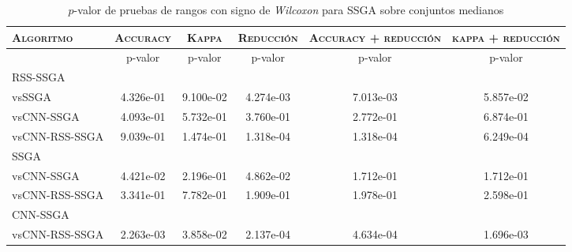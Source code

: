 \begin{table}[h!]
\centering
\begin{adjustbox}{max width =\textwidth}
\begin{tabular}{l c c c c c}
\hline
	\textsc{Algoritmo}
	& \multicolumn{1}{c}{\textsc{Accuracy}}
	& \multicolumn{1}{c}{\textsc{Kappa}}
	& \multicolumn{1}{c}{\textsc{Reducción}} 
	& \multicolumn{1}{c}{\textsc{Accuracy + reducción}} 
	& \multicolumn{1}{c}{\textsc{kappa + reducción}} \\
\hline
\hline

 & p-valor & p-valor & p-valor & p-valor & p-valor \\

RSS-SSGA\\
vsSSGA & 4.326e-01 & 9.100e-02 & 4.274e-03 & 7.013e-03 & 5.857e-02 \\
vsCNN-SSGA & 4.093e-01 & 5.732e-01 & 3.760e-01 & 2.772e-01 & 6.874e-01 \\ 
vsCNN-RSS-SSGA & 9.039e-01 & 1.474e-01 & 1.318e-04 & 1.318e-04 & 6.249e-04 \\

\hline

SSGA\\
vsCNN-SSGA & 4.421e-02 & 2.196e-01 & 4.862e-02 & 1.712e-01 & 1.712e-01 \\  
vsCNN-RSS-SSGA & 3.341e-01 & 7.782e-01 & 1.909e-01 & 1.978e-01 & 2.598e-01 \\ 

\hline

CNN-SSGA\\
vsCNN-RSS-SSGA & 2.263e-03 & 3.858e-02 & 2.137e-04 & 4.634e-04 & 1.696e-03 \\


\hline

\end{tabular}
\end{adjustbox}
\caption[Pruebas de \emph{Wilcoxon} entre SSGA y variaciones para conjuntos medianos]{$p$-valor de pruebas de rangos con signo de \emph{Wilcoxon} para SSGA sobre conjuntos medianos}
\label{wilcox-SSGA-med}
\end{table}


